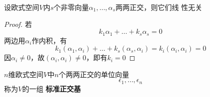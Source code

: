 \documentclass[11pt]{article}
\begin{document}
\begin{proposition}[]
设欧式空间\(V\)内\(s\)个非零向量\(\alpha_1,\dots,\alpha_s\)两两正交，则它们线
性无关
\end{proposition}

\begin{proof}
若
\begin{equation*}
k_1\alpha_1+\dots+k_s\alpha_s=0
\end{equation*}
两边用\(\alpha_i\)作内积，有
\begin{equation*}
k_1(\alpha_1,\alpha_i)+\dots+k_s(\alpha_s,\alpha_i)=k_i(\alpha_i,\alpha_i)=0
\end{equation*}
因\(\alpha_i\neq0\)，故\((\alpha_i,\alpha_i)\neq0\)，即有\(k_i=0\)
\end{proof}

\begin{definition}[]
\(n\)维欧式空间\(V\)中\(n\)个两两正交的单位向量
\begin{equation*}
\epsilon_1,\dots,\epsilon_n
\end{equation*}
称为\(V\)的一组 \textbf{标准正交基} 
\end{definition}
\end{document}
